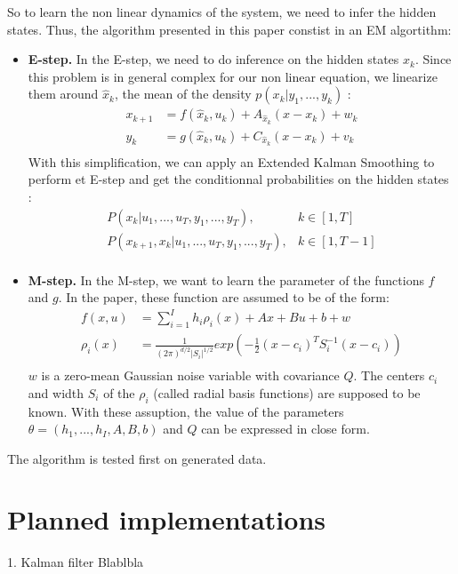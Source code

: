 \documentclass[11pt, oneside]{amsart}
\begin{document}
So to learn the non linear dynamics of the system, we need to infer the hidden states.
Thus, the algorithm presented in this paper constist in an EM algortithm:
\begin{itemize}
  \item \textbf{E-step.}
    In the E-step, we need to do inference on the hidden states $x_k$.
    Since this problem is in general complex for our non linear equation, we linearize them around $\hat{x}_k$, the mean of the density $p(x_k | y_1, ... , y_k)$ :
    \begin{align*}
      x_{k+1} &= f(\hat{x}_k, u_k) + A_{\hat{x}_k} (x - x_k) + w_k\\
      y_k &= g(\hat{x}_k, u_k) + C_{\hat{x}_k} (x - x_k) + v_k\\
    \end{align*}
    With this simplification, we can apply an Extended Kalman Smoothing to perform et E-step and get the conditionnal probabilities on the hidden states :
    \begin{align*}
      P(x_k |u_1, ..., u_T, y_1, ... , y_T),& k \in [1,T]\\
      P(x_{k+1}, x_k |u_1, ..., u_T, y_1, ... , y_T),& k \in [1,T-1]\\
    \end{align*}
  \item \textbf{M-step.}
    In the M-step, we want to learn the parameter of the functions $f$ and $g$.
    In the paper, these function are assumed to be of the form:
    \begin{align*}
      f(x,u) &= \sum_{i=1}^I h_i \rho_i(x) + Ax + Bu + b + w\\
      \rho_i(x) &= \frac{1}{(2\pi)^{d/2}|S_i|^{1/2}} exp\left(-\frac{1}{2}(x-c_i)^TS_i^{-1}(x-c_i)\right)\\
    \end{align*}
    $w$ is a zero-mean Gaussian noise variable with covariance $Q$.
    The centers $c_i$ and width $S_i$ of the $\rho_i$ (called radial basis functions) are supposed to be known.
    With these assuption, the value of the parameters $\theta = \left( h_1, ..., h_I, A, B, b\right)$ and $Q$ can be expressed in close form.
\end{itemize}

The algorithm is tested first on generated data.

\section{Planned implementations}

1. Kalman filter
Blablbla
\end{document}
